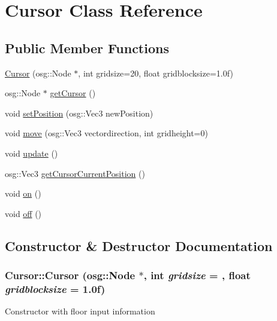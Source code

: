 \hypertarget{class_cursor}{
\section{Cursor Class Reference}
\label{class_cursor}
}
\subsection*{Public Member Functions}
\begin{DoxyCompactItemize}
\item 
\hyperlink{class_cursor_a1e3eaf54b9d1c3323d53757f5c69f5cc}{Cursor} (osg::Node $\ast$, int gridsize=20, float gridblocksize=1.0f)
\item 
osg::Node $\ast$ \hyperlink{class_cursor_a54b6cc7f6310ea31fc935629c75df6e1}{getCursor} ()
\item 
void \hyperlink{class_cursor_a0079aea0a93588c7951f0bf869599300}{setPosition} (osg::Vec3 newPosition)
\item 
void \hyperlink{class_cursor_a2f4cb72de21bdefb8a9875e2a2974b48}{move} (osg::Vec3 vectordirection, int gridheight=0)
\item 
void \hyperlink{class_cursor_a022993b56c498cd92001c99116f1081a}{update} ()
\item 
osg::Vec3 \hyperlink{class_cursor_a6682ab87a40385277e836ab299b0a4e5}{getCursorCurrentPosition} ()
\item 
void \hyperlink{class_cursor_a3ca49b518bc6cca718f0a5d04595d1cf}{on} ()
\item 
void \hyperlink{class_cursor_aaa35f57cf0b65c009c949c59276df3fd}{off} ()
\end{DoxyCompactItemize}


\subsection{Constructor \& Destructor Documentation}
\hypertarget{class_cursor_a1e3eaf54b9d1c3323d53757f5c69f5cc}{
\subsubsection[{Cursor}]{\setlength{\rightskip}{0pt plus 5cm}Cursor::Cursor (osg::Node $\ast$, \/  int {\em gridsize} = {}, \/  float {\em gridblocksize} = {\ttfamily 1.0f})}}
\label{class_cursor_a1e3eaf54b9d1c3323d53757f5c69f5cc}
Constructor with floor input information 

